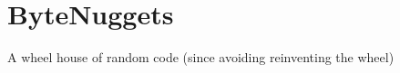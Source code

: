 \chapter{Byte\+Nuggets}
\hypertarget{md__r_e_a_d_m_e}{}\label{md__r_e_a_d_m_e}
\label{md__r_e_a_d_m_e_autotoc_md0}%
%


A wheel house of random code (since avoiding reinventing the wheel) 